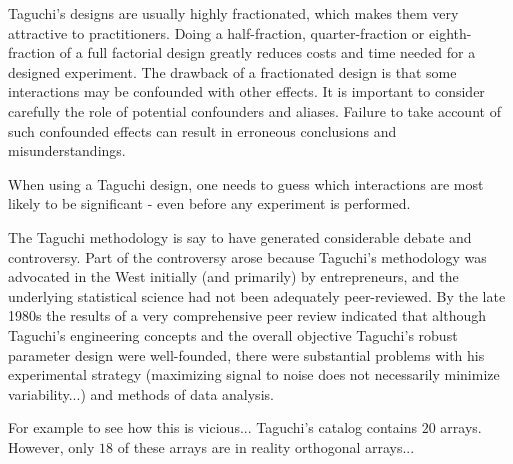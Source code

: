 	Taguchi's designs are usually highly fractionated, which makes them very attractive to practitioners. Doing a half-fraction, quarter-fraction or eighth-fraction of a full factorial design greatly reduces costs and time needed for a designed experiment. The drawback of a fractionated design is that some interactions may be confounded with other effects. It is important to consider carefully the role of potential confounders and aliases. Failure to take account of such confounded effects can result in erroneous conclusions and misunderstandings.

	When using a Taguchi design, one needs to guess which interactions are most likely to be significant - even before any experiment is performed.
	
	The Taguchi methodology is say to have generated considerable debate and controversy. Part of the controversy arose because Taguchi's methodology was advocated in the West initially (and primarily) by entrepreneurs, and the underlying statistical science had not been adequately peer-reviewed. By the late 1980s the results of a very comprehensive peer review indicated that although Taguchi's engineering concepts and the overall objective Taguchi's robust parameter design were well-founded\cite{co2008confirmation}, there were substantial problems with his experimental strategy (maximizing signal to noise does not necessarily minimize variability...) and methods of data analysis\cite{kacker1991taguchi}.
	\begin{tcolorbox}[title=Remark,colframe=black,arc=10pt]
	For example to see how this is vicious... Taguchi's catalog contains $20$ arrays. However, only $18$ of these arrays are in reality orthogonal arrays...
	\end{tcolorbox}


